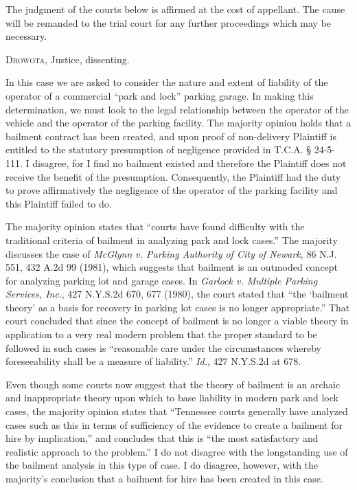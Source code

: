The judgment of the courts below is affirmed at the cost of appellant. The cause
will be remanded to the trial court for any further proceedings which may be
necessary.

\opinion \textsc{Drowota}, Justice, dissenting.

In this case we are asked to consider the nature and extent of liability of the
operator of a commercial ``park and lock'' parking garage. In making this
determination, we must look to the legal relationship between the operator of
the vehicle and the operator of the parking facility. The majority opinion
holds that a bailment contract has been created, and upon proof of non-delivery
Plaintiff is entitled to the statutory presumption of negligence provided in
T.C.A. {\S} 24-5-111. I disagree, for I find no bailment existed and therefore
the Plaintiff does not receive the benefit of the presumption. Consequently,
the Plaintiff had the duty to prove affirmatively the negligence of the
operator of the parking facility and this Plaintiff failed to do.

The majority opinion states that ``courts have found difficulty with the
traditional criteria of bailment in analyzing park and lock cases.'' The
majority discusses the case of \textit{McGlynn v. Parking Authority of City of
Newark}, 86 N.J. 551, 432 A.2d 99 (1981), which suggests that bailment is an
outmoded concept for analyzing parking lot and garage cases. In \textit{Garlock
v. Multiple Parking Services, Inc}., 427 N.Y.S.2d 670, 677 (1980), the court
stated that ``the `bailment theory' as a basis for recovery in parking lot
cases is no longer appropriate.'' That court concluded that since the concept
of bailment is no longer a viable theory in application to a very real modern
problem that the proper standard to be followed in such cases is ``reasonable
care under the circumstances whereby foreseeability shall be a measure of
liability.'' \textit{Id.}, 427 N.Y.S.2d at 678.

Even though some courts now suggest that the theory of bailment is an archaic
and inappropriate theory upon which to base liability in modern park and lock
cases, the majority opinion states that ``Tennessee courts generally have
analyzed cases such as this in terms of sufficiency of the evidence to create a
bailment for hire by implication,'' and concludes that this is ``the most
satisfactory and realistic approach to the problem.'' I do not disagree with
the longstanding use of the bailment analysis in this type of case. I do
disagree, however, with the majority's conclusion that a bailment for hire has
been created in this case.

